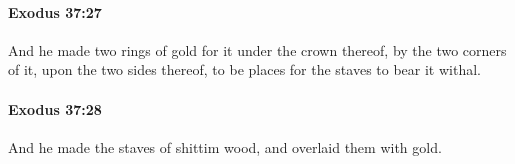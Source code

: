 		\paragraph{Exodus 37:27} %
			\label{EXODUS-37-27}

			And he made two rings of gold for it under the crown thereof, by the two corners of it, upon the two sides thereof, to be places for the staves to bear it withal.


		\paragraph{Exodus 37:28} %
			\label{EXODUS-37-28}

			And he made the staves of shittim wood, and overlaid them with gold.



